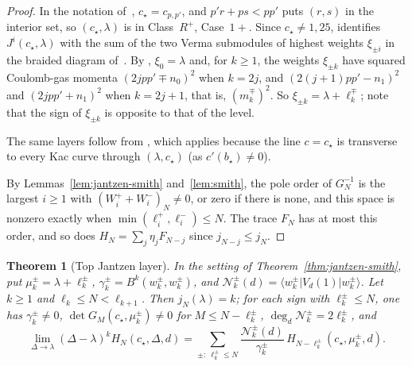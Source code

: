 \documentclass[twoside,10pt]{article}
\numberwithin{equation}{section}
\theoremstyle{slbody}
\newtheorem{theorem}{Theorem}[section]
\theoremstyle{definition}
\theoremstyle{remark}
\begin{document}
\begin{proof}
In the notation of~\cite[\S5.1.4]{IoharaKoga2011}, \(c_\star=c_{p,p'}\), and
\(p'r+ps<pp'\) puts \((r,s)\) in the interior set, so \((c_\star,\lambda)\) is in
Class~\(R^+\), Case~\(1+\).  Since \(c_\star\neq1,25\),
\cite[Theorem~6.3(i), (6.3)]{IoharaKoga2011} identifies \(J^i(c_\star,\lambda)\)
with the sum of the two Verma submodules of highest weights \(\xi_{\pm i}\) in
the braided diagram of~\cite[Proposition~5.4 and Figure~5.4]{IoharaKoga2011}.
By \cite[(5.4) and (5.22)]{IoharaKoga2011}, \(\xi_0=\lambda\)
and, for \(k\geq1\), the weights \(\xi_{\pm k}\) have squared Coulomb-gas
momenta \((2jpp'\mp n_0)^2\) when \(k=2j\), and \((2(j+1)pp'-n_1)^2\) and
\((2jpp'+n_1)^2\) when \(k=2j+1\), that is, \((m^\mp_k)^2\).  So
\(\xi_{\pm k}=\lambda+\ell^\mp_k\); note that the sign of \(\xi_{\pm k}\) is
opposite to that of the level.

The same layers follow from \cite[Theorem~B(e), case \(\mathrm{III}_-\)]{Astashkevich1997},
which applies because the line \(c=c_\star\) is transverse to every Kac
curve through \((\lambda,c_\star)\) (as \(c'(b_\star)\neq0\)).

By Lemmas~\ref{lem:jantzen-smith} and~\ref{lem:smith}, the pole order of
\(G_N^{-1}\) is the largest \(i\geq1\) with \((W^+_i+W^-_i)_N\neq0\), or zero if
there is none, and this space is
nonzero exactly when \(\min(\ell^+_i,\ell^-_i)\leq N\). The trace \(F_N\) has at most
this order, and so does \(H_N=\sum_j\eta_jF_{N-j}\) since \(j_{N-j}\leq j_N\).
\end{proof}

\begin{theorem}[Top Jantzen layer]\label{thm:top-layer}
In the setting of Theorem~\ref{thm:jantzen-smith}, put
\(\mu^\pm_k=\lambda+\ell^\pm_k\),
\(\gamma^\pm_k=B^k(w^\pm_k,w^\pm_k)\), and
\(\mathcal N^\pm_k(d)=\langle w^\pm_k|V_d(1)|w^\pm_k\rangle\).
Let \(k\geq1\) and \(\ell_k\leq N<\ell_{k+1}\).  Then \(j_N(\lambda)=k\);
for each sign with \(\ell^\pm_k\leq N\), one has \(\gamma^\pm_k\neq0\),
\(\det G_M(c_\star,\mu^\pm_k)\neq0\) for \(M\leq N-\ell^\pm_k\),
\(\deg_d\mathcal N^\pm_k=2\ell^\pm_k\), and
\begin{equation}\label{eq:top-layer}
 \lim_{\Delta\to\lambda}(\Delta-\lambda)^kH_N(c_\star,\Delta,d)
 =\sum_{\pm:\ \ell^\pm_k\leq N}\frac{\mathcal N^\pm_k(d)}{\gamma^\pm_k}\,
 H_{N-\ell^\pm_k}(c_\star,\mu^\pm_k,d).
\end{equation}
\end{theorem}
\end{document}
